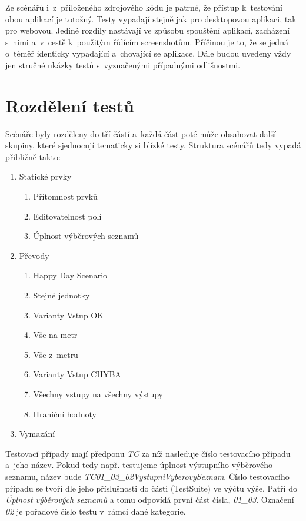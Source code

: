 Ze scénářů i~z~přiloženého zdrojového kódu je patrné, že přístup k~testování obou aplikací je totožný. Testy vypadají stejně jak pro desktopovou aplikaci, tak pro webovou. Jediné rozdíly nastávají ve způsobu spouštění aplikací, zacházení s~nimi a~v~cestě k~použitým řídícím screenshotům. Příčinou je to, že se jedná o~téměř identicky vypadající a~chovající se aplikace. Dále budou uvedeny vždy jen stručné ukázky testů s~vyznačenými případnými odlišnostmi.

	\section{Rozdělení testů}
	Scénáře byly rozděleny do tří částí a~každá část poté může obsahovat další skupiny, které sjednocují tematicky si blízké testy. Struktura scénářů tedy vypadá přibližně takto:
		{\renewcommand{\labelenumii}{\theenumii}
		\renewcommand{\theenumii}{\theenumi.\arabic{enumii}.}
		\begin{enumerate}
		\item Statické prvky
			\begin{enumerate}
			\item Přítomnost prvků
			\item Editovatelnost polí
			\item Úplnost výběrových seznamů
			\end{enumerate}
		\item Převody
			\begin{enumerate}
			\item Happy Day Scenario
			\item Stejné jednotky
			\item Varianty Vstup OK
			\item Vše na metr
			\item Vše z~metru
			\item Varianty Vstup CHYBA
			\item Všechny vstupy na všechny výstupy
			\item Hraniční hodnoty
			\end{enumerate}
		\item Vymazání
		\end{enumerate}}
		
	Testovací případy mají předponu \emph{TC} za níž nasleduje číslo testovacího případu a~jeho název. Pokud tedy např. testujeme úplnost výstupního výběrového seznamu, název bude \emph{TC01\_03\_02VystupniVyberovySeznam}. Číslo testovacího případu se tvoří dle jeho příslušnosti do části (TestSuite) ve výčtu výše. Patří do \emph{Úplnost výběrových seznamů} a tomu odpovídá první část čísla, \emph{01\_03}. Označení \emph{02} je pořadové číslo testu v~rámci dané kategorie.
		
